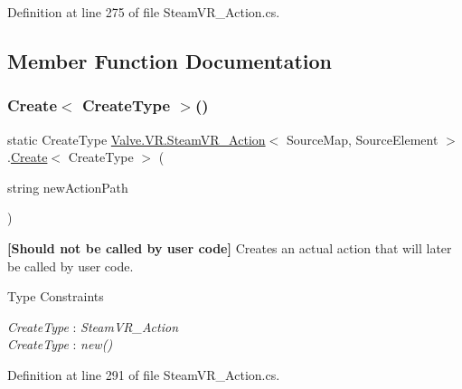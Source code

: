 Definition at line 275 of file Steam\+V\+R\+\_\+\+Action.\+cs.



\subsection{Member Function Documentation}
\mbox{\label{class_valve_1_1_v_r_1_1_steam_v_r___action_a75746fdff4c10e89c9e43bd598a106f0}} 
\subsubsection{\texorpdfstring{Create$<$ CreateType $>$()}{Create< CreateType >()}}
{\footnotesize\ttfamily static Create\+Type \mbox{\hyperlink{class_valve_1_1_v_r_1_1_steam_v_r___action}{Valve.\+V\+R.\+Steam\+V\+R\+\_\+\+Action}}$<$ Source\+Map, Source\+Element $>$.\mbox{\hyperlink{namespace_valve_1_1_v_r_a59487dd6eb3684570995a3bea405db2ea686e697538050e4664636337cc3b834f}{Create}}$<$ Create\+Type $>$ (\begin{DoxyParamCaption}\item[{string}]{new\+Action\+Path }\end{DoxyParamCaption})\hspace{0.3cm}{\ttfamily [static]}}



{\bfseries{\mbox{[}Should not be called by user code\mbox{]}}} Creates an actual action that will later be called by user code. 

\begin{Desc}
\item[Type Constraints]\begin{description}
\item[{\em Create\+Type} : {\em Steam\+V\+R\+\_\+\+Action}]\item[{\em Create\+Type} : {\em new()}]\end{description}
\end{Desc}


Definition at line 291 of file Steam\+V\+R\+\_\+\+Action.\+cs.

\mbox{\label{class_valve_1_1_v_r_1_1_steam_v_r___action_af69bed4c4b5b9640c2cac9e118743df3}} 
